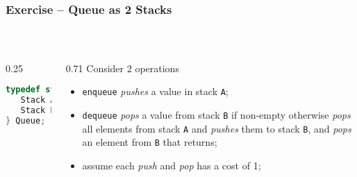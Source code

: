 \documentclass[aspectratio=169]{beamer}
\begin{document}
\begin{frame}[fragile]\frametitle{Exercise -- Queue as 2 Stacks}

~\\[-3mm]
\begin{columns}
\begin{column}{0.25\textwidth}
\begin{lstlisting}[language=C++,emph={Stack,Queue}]
typedef struct queue {
   Stack A;
   Stack B;
} Queue;
\end{lstlisting}
\end{column}
\begin{column}{0.71\textwidth}
Consider 2 operations
\begin{itemize}
    \item \texttt{enqueue} \emph{pushes} a value in stack \texttt{A};
    \item \texttt{dequeue} \emph{pops} a value from stack \texttt{B} if non-empty otherwise \emph{pops} all elements from stack \texttt{A} and \emph{pushes} them to stack \texttt{B}, and \emph{pops} an element from \texttt{B} that returns;
    \item assume each \emph{push} and \emph{pop} has a cost of 1;
  \end{itemize}
\end{column}
\end{columns}

~\\[-4mm]
~\\[-11mm]
~\\[-11mm]
\end{frame}

\end{document}
